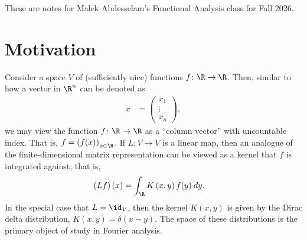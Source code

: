 \documentclass[10pt]{mypackage}
\begin{document}
\RaggedRight
These are notes for Malek Abdesselam's Functional Analysis class for Fall 2026.
\tableofcontents
\section{Motivation}%
Consider a space $V$ of (sufficiently nice) functions $f\colon \R\rightarrow \R$. Then, similar to how a vector in $\R^n$ can be denoted as
\begin{align*}
  x &= \begin{pmatrix}x_1\\\vdots\\x_n\end{pmatrix},
\end{align*}
we may view the function $f\colon \R\rightarrow \R$ as a ``column vector'' with uncountable index. That is, $f = \left( f(x) \right)_{x\in \R}$. If $L\colon V\rightarrow V$ is a linear map, then an analogue of the finite-dimensional matrix representation can be viewed as a kernel that $f$ is integrated against; that is,
\begin{align*}
  \left( Lf \right)(x) &= \int_{\R}^{} K\left( x,y \right)f(y)\:dy.
\end{align*}
In the special case that $L = \id_V$, then the kernel $K\left( x,y \right)$ is given by the Dirac delta distribution, $K\left( x,y \right) = \delta\left( x-y \right)$. The space of these distributions is the primary object of study in Fourier analysis.
\end{document}
